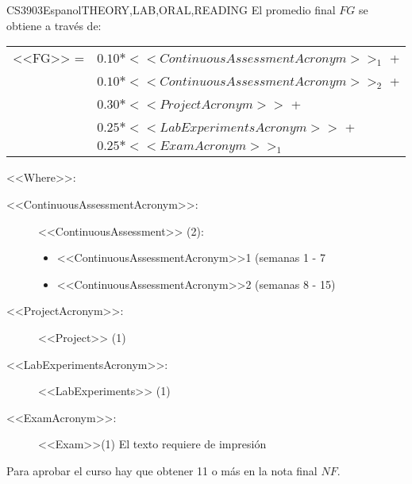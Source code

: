   \begin{evaluation}{CS3903}{Espanol}{THEORY,LAB,ORAL,READING}
  El promedio final $FG$ se obtiene a través de:
 
  \begin{tabular}{cl}
      <<FG>> = & $0.10*<<ContinuousAssessmentAcronym>>_{1}$ +\\
               & $0.10*<<ContinuousAssessmentAcronym>>_{2}$ +\\
               & $0.30*<<ProjectAcronym>>$ + \\
               & $0.25*<<LabExperimentsAcronym>>$ + \\
               & $0.25*<<ExamAcronym>>_{1}$
  \end{tabular}
 
  \noindent <<Where>>:
  \begin{description}
  \item[<<ContinuousAssessmentAcronym>>:] <<ContinuousAssessment>> (2):
       \begin{itemize}
             \item  <<ContinuousAssessmentAcronym>>1 (semanas 1 - 7
              \item <<ContinuousAssessmentAcronym>>2 (semanas 8 - 15) 
       \end{itemize}
   \item[<<ProjectAcronym>>:]  <<Project>> (1)
   \item[<<LabExperimentsAcronym>>:] <<LabExperiments>> (1)
   \item[<<ExamAcronym>>:] <<Exam>>(1) El texto requiere de impresión
  \end{description}
\noindent Para aprobar el curso hay que obtener 11 o más en la nota final $NF$.
  \end{evaluation}
 


